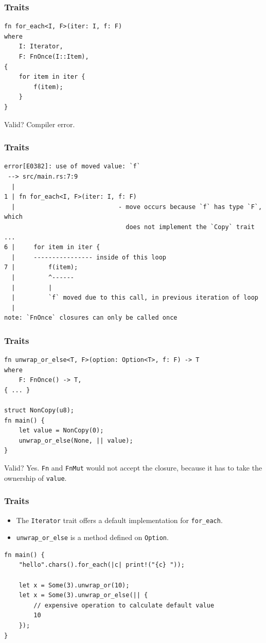 \begin{frame}[fragile]
    \frametitle{Traits}
    \begin{verbatim}
fn for_each<I, F>(iter: I, f: F)
where
    I: Iterator,
    F: FnOnce(I::Item),
{
    for item in iter {
        f(item);
    }
}
    \end{verbatim}
    \vfill
    Valid?
    \pause
    \vfill
    Compiler error.
\end{frame}

\begin{frame}[fragile]
    \frametitle{Traits}
    \begin{verbatim}
error[E0382]: use of moved value: `f`
 --> src/main.rs:7:9
  |
1 | fn for_each<I, F>(iter: I, f: F)
  |                            - move occurs because `f` has type `F`, which
                                 does not implement the `Copy` trait
...
6 |     for item in iter {
  |     ---------------- inside of this loop
7 |         f(item);
  |         ^------
  |         |
  |         `f` moved due to this call, in previous iteration of loop
  |
note: `FnOnce` closures can only be called once
    \end{verbatim}
\end{frame}

\begin{frame}[fragile]
    \frametitle{Traits}
    \begin{verbatim}
fn unwrap_or_else<T, F>(option: Option<T>, f: F) -> T
where
    F: FnOnce() -> T,
{ ... }

struct NonCopy(u8);
fn main() {
    let value = NonCopy(0);
    unwrap_or_else(None, || value);
}
    \end{verbatim}
    \pause
    \vfill
    Valid?
    \pause
    Yes. \texttt{Fn} and \texttt{FnMut} would not accept the closure, because it has to take the ownership of \texttt{value}.
\end{frame}

\begin{frame}[fragile]
    \frametitle{Traits}
    \begin{itemize}
        \item The \texttt{Iterator} trait offers a default implementation for \texttt{for\_each}.
        \item \texttt{unwrap\_or\_else} is a method defined on \texttt{Option}.
    \end{itemize}
    \pause
    \vfill
    \begin{verbatim}
fn main() {
    "hello".chars().for_each(|c| print!("{c} "));

    let x = Some(3).unwrap_or(10);
    let x = Some(3).unwrap_or_else(|| {
        // expensive operation to calculate default value
        10
    });
}
    \end{verbatim}
\end{frame}

